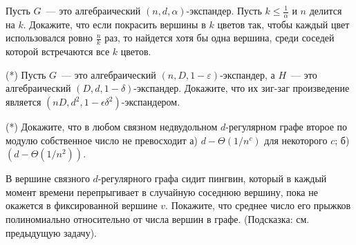 \begin{ptask}{7}
    Пусть $G$~--- это алгебраический $(n,d,\alpha)$-экспандер. Пусть 
	$k\le \frac{1}{\alpha}$ и $n$ делится на $k$. Докажите, что если покрасить
    вершины  в $k$ цветов так, чтобы каждый цвет использовался ровно $\frac{n}{k}$
	раз, то найдется хотя бы одна вершина, среди соседей которой встречаются все $k$
    цветов.
\end{ptask}


\begin{ptask}{9}(*)
	Пусть $G$~--- это алгебраический $(n, D, 1 - \varepsilon)$-экспандер, а $H$~---
    это алгебраический $(D, d, 1 - \delta)$-экспандер. Докажите, что их зиг-заг
    произведение является $(nD, d^2, 1 - \epsilon \delta^2)$-экспандером.
\end{ptask}

\begin{ptask}{10}(*)
	Докажите, что в любом связном недвудольном $d$-регулярном графе второе по модулю
	собственное число не превосходит а) $d - \Theta(1 / n^c)$ для некоторого $c$;
	б) $(d - \Theta(1 / n^2))$.
\end{ptask}

\begin{ptask}{11}
	В вершине связного $d$-регулярного графа сидит пингвин, который в каждый момент
	времени перепрыгивает в случайную соседнюю вершину, пока не окажется в
    фиксированной вершине $v$. Покажите, что среднее число его прыжков полиномиально
    относительно от числа вершин в графе. (Подсказка: см. предыдущую задачу).
\end{ptask}